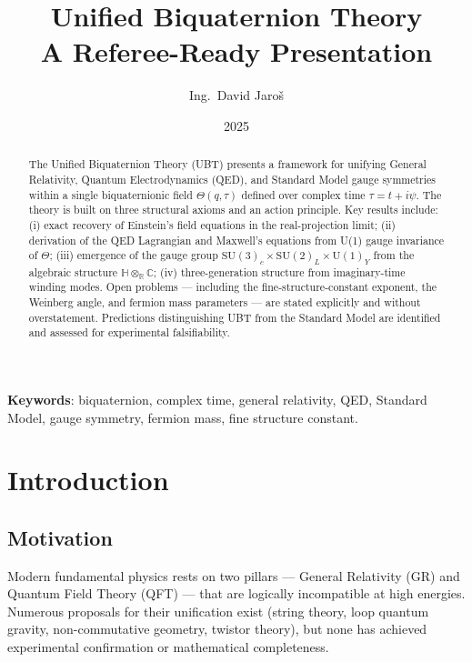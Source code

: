 \documentclass[12pt,a4paper]{article}
\title{\textbf{Unified Biquaternion Theory}\\[6pt]
\large A Referee-Ready Presentation}
\author{Ing.\ David Jaroš}
\date{2025}
\begin{document}
\maketitle

\begin{abstract}
The Unified Biquaternion Theory (UBT) presents a framework for unifying
General Relativity, Quantum Electrodynamics (QED), and Standard Model gauge
symmetries within a single biquaternionic field $\Theta(q,\tau)$ defined over
complex time $\tau = t + i\psi$.  The theory is built on three structural
axioms and an action principle.  Key results include: (i) exact recovery of
Einstein's field equations in the real-projection limit; (ii) derivation of
the QED Lagrangian and Maxwell's equations from U(1) gauge invariance of
$\Theta$; (iii) emergence of the gauge group
$\mathrm{SU}(3)_c\times\mathrm{SU}(2)_L\times\mathrm{U}(1)_Y$
from the algebraic structure $\mathbb{H}\otimes_\mathbb{R}\mathbb{C}$;
(iv) three-generation structure from imaginary-time winding modes.
Open problems — including the fine-structure-constant exponent, the Weinberg
angle, and fermion mass parameters — are stated explicitly and without
overstatement.  Predictions distinguishing UBT from the Standard Model are
identified and assessed for experimental falsifiability.
\end{abstract}

\noindent\textbf{Keywords}: biquaternion, complex time, general relativity,
QED, Standard Model, gauge symmetry, fermion mass, fine structure constant.

\tableofcontents
\newpage

\section{Introduction}

\subsection{Motivation}

Modern fundamental physics rests on two pillars — General Relativity (GR)
and Quantum Field Theory (QFT) — that are logically incompatible at high
energies.  Numerous proposals for their unification exist (string theory,
loop quantum gravity, non-commutative geometry, twistor theory), but none
has achieved experimental confirmation or mathematical completeness.
\end{document}
